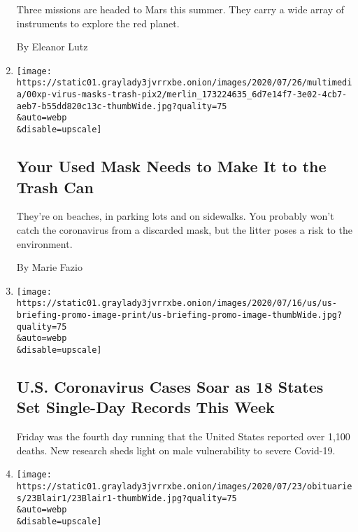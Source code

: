 \begin{enumerate}
  Three missions are headed to Mars this summer. They carry a wide array
  of instruments to explore the red planet.

  By Eleanor Lutz
\item
  \href{/2020/07/25/climate/covid-masks-discarded.html}{}

  \texttt{[image: https://static01.graylady3jvrrxbe.onion/images/2020/07/26/multimedia/00xp-virus-masks-trash-pix2/merlin\_173224635\_6d7e14f7-3e02-4cb7-aeb7-b55dd820c13c-thumbWide.jpg?quality=75\\\&auto=webp\\\&disable=upscale]}

  \hypertarget{your-used-mask-needs-to-make-it-to-the-trash-can}{%
  \subsection{Your Used Mask Needs to Make It to the Trash
  Can}\label{your-used-mask-needs-to-make-it-to-the-trash-can}}

  They're on beaches, in parking lots and on sidewalks. You probably
  won't catch the coronavirus from a discarded mask, but the litter
  poses a risk to the environment.

  By Marie Fazio
\item
  \href{/2020/07/25/world/coronavirus-covid-19.html}{}

  \texttt{[image: https://static01.graylady3jvrrxbe.onion/images/2020/07/16/us/us-briefing-promo-image-print/us-briefing-promo-image-thumbWide.jpg?quality=75\\\&auto=webp\\\&disable=upscale]}

  \hypertarget{us-coronavirus-cases-soar-as-18-states-set-single-day-records-this-week}{%
  \subsection{U.S. Coronavirus Cases Soar as 18 States Set Single-Day
  Records This
  Week}\label{us-coronavirus-cases-soar-as-18-states-set-single-day-records-this-week}}

  Friday was the fourth day running that the United States reported over
  1,100 deaths. New research sheds light on male vulnerability to severe
  Covid-19.
\item
  \href{/2020/07/24/us/bruce-blair-dead.html}{}

  \texttt{[image: https://static01.graylady3jvrrxbe.onion/images/2020/07/23/obituaries/23Blair1/23Blair1-thumbWide.jpg?quality=75\\\&auto=webp\\\&disable=upscale]}

  \hypertarget{bruce-blair-crusader-for-nuclear-arms-control-dies-at-72}{%
}
\end{enumerate}
